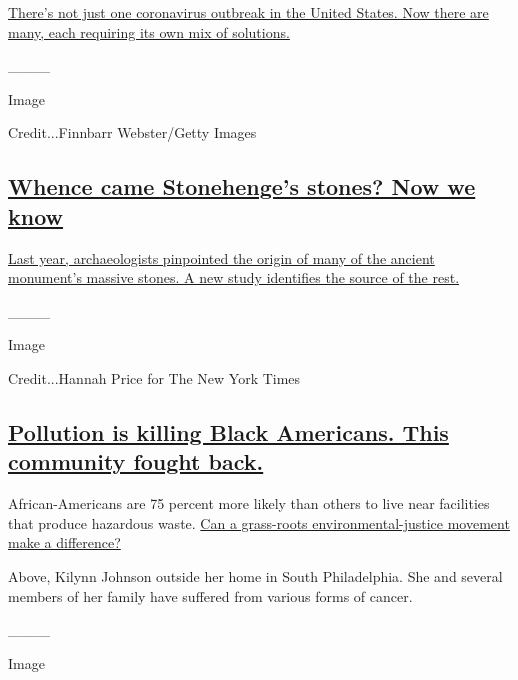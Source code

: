 \href{https://www.nytimes.com/2020/07/29/health/coronavirus-future-america.html}{There's
not just one coronavirus outbreak in the United States. Now there are
many, each requiring its own mix of solutions.}

\_\_\_\_

Image

Credit...Finnbarr Webster/Getty Images

\hypertarget{whence-came-stonehenges-stones-now-we-know}{%
\subsection{\texorpdfstring{\href{https://www.nytimes.com/2020/07/29/science/stonehenge-archaeology-sarsens.html}{Whence
came Stonehenge's stones? Now we
know}}{Whence came Stonehenge's stones? Now we know}}\label{whence-came-stonehenges-stones-now-we-know}}

\href{https://www.nytimes.com/2020/07/29/science/stonehenge-archaeology-sarsens.html}{Last
year, archaeologists pinpointed the origin of many of the ancient
monument's massive stones. A new study identifies the source of the
rest.}

\_\_\_\_

Image

Credit...Hannah Price for The New York Times

\hypertarget{pollution-is-killing-black-americans-this-community-fought-back}{%
\subsection{\texorpdfstring{\href{https://www.nytimes.com/2020/07/28/magazine/pollution-philadelphia-black-americans.html}{Pollution
is killing Black Americans. This community fought
back.}}{Pollution is killing Black Americans. This community fought back.}}\label{pollution-is-killing-black-americans-this-community-fought-back}}

African-Americans are 75 percent more likely than others to live near
facilities that produce hazardous waste.
\href{https://www.nytimes.com/2020/07/28/magazine/pollution-philadelphia-black-americans.html}{Can
a grass-roots environmental-justice movement make a difference?}

Above, Kilynn Johnson outside her home in South Philadelphia. She and
several members of her family have suffered from various forms of
cancer.

\_\_\_\_

Image

